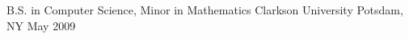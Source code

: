 

\begin{cventries}

  \cventry
    {B.S. in Computer Science, Minor in Mathematics} %
    {Clarkson University} %
    {Potsdam, NY} %
    {May 2009} %
    {}


\end{cventries}
